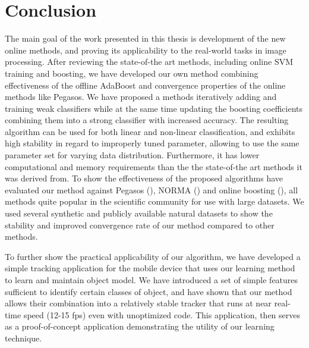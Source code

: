 
\chapter{Conclusion} %

The main goal of the work presented in this thesis is development of the new online methods, and proving its applicability to the real-world tasks in image processing. After reviewing the state-of-the art methods, including online SVM training and boosting, we have developed our own method combining  effectiveness of the offline AdaBoost and convergence properties of the online methods like Pegasos. We have proposed a methods iteratively adding and training weak classifiers while at the same time updating the boosting coefficients combining them into a strong classifier with increased accuracy. The resulting algorithm can be used for both linear and non-linear classification, and exhibits high stability in regard to improperly tuned parameter, allowing to use the same parameter set for varying data distribution. Furthermore, it has lower computational and memory requirements than the the state-of-the art methods it was derived from. 
To show the effectiveness of the proposed algorithms have evaluated our method against Pegasos (\cite{Pegasos}), NORMA  (\cite{Norma}) and online boosting (\cite{OnlineBoost}), all methods quite popular in the scientific community for use with large datasets. We used several synthetic and publicly available natural datasets to show the stability and improved convergence rate of our method compared to other methods.

To further show the practical applicability of our algorithm, we have developed a simple tracking application for the mobile device that uses our learning method to learn and maintain object model. We have introduced a set of simple features sufficient to identify certain classes of object, and have shown that our method allows their combination into a relatively stable tracker that runs at near real-time speed (12-15 fps) even with unoptimized code. This application, then serves as a proof-of-concept application demonstrating the utility of our learning technique.



\ifpdf
    \graphicspath{{7/figures/PNG/}{7/figures/PDF/}{7/figures/}}
\else
    \graphicspath{{7/figures/EPS/}{7/figures/}}
\fi








